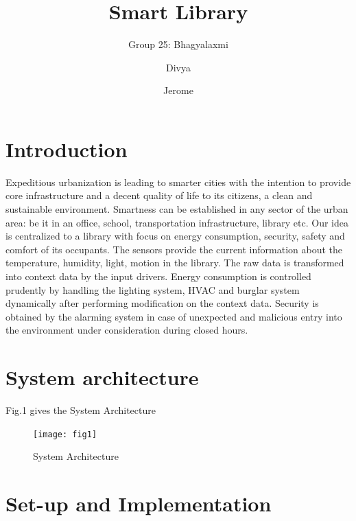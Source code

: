 \documentclass[runningheads]{llncs}
\begin{document}
%

\title{Smart Library}

\author{Group 25: Bhagyalaxmi \and
Divya \and
Jerome}

%
\maketitle              %
%
%
%
%
\section{Introduction}
Expeditious urbanization is leading to smarter cities with the intention to provide core infrastructure and a decent quality of life to its citizens, a clean and sustainable environment. Smartness can be established in any sector of the urban area: be it in an office, school, transportation infrastructure, library etc. 
Our idea is centralized to a library with focus on energy consumption, security, safety and comfort of its occupants. The sensors provide the current information about the temperature, humidity, light, motion in the library. The raw data  is transformed into context data by the input drivers. Energy consumption is controlled prudently by handling the lighting system, HVAC and burglar system dynamically after performing modification on the context data. Security is obtained by the alarming system in case of unexpected and malicious entry into the environment under consideration during closed hours.





\section{System architecture}
Fig.1 gives the System Architecture
\begin{figure}
\begin{center}
\texttt{[image: fig1]}
\caption{System Architecture}
\end{center}
\end{figure}
\section{Set-up and Implementation}
\end{document}
